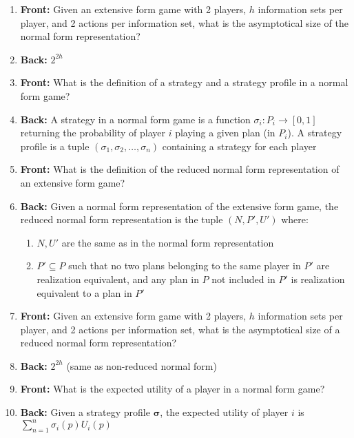 \documentclass{article}
\begin{document}
\begin{enumerate}
    \newpage\item \textbf{Front:} Given an extensive form game with 2 players, $h$ information sets per player, and 2 actions per information set, what is the asymptotical size of the normal form representation?
    \newpage\item \textbf{Back:} $2^{2h}$
    
    \newpage\item \textbf{Front:} What is the definition of a strategy and a strategy profile in a normal form game?
    \newpage\item \textbf{Back:} A strategy in a normal form game is a function $\sigma_i: P_i \rightarrow [0,1]$ returning the probability of player $i$ playing a given plan (in $P_i$).\newline
    A strategy profile is a tuple $(\sigma_1, \sigma_2, \ldots, \sigma_n)$ containing a strategy for each player
    
    \newpage\item \textbf{Front:} What is the definition of the reduced normal form representation of an extensive form game?
    \newpage\item \textbf{Back:} Given a normal form representation of the extensive form game, the reduced normal form representation is the tuple $(N, P', U')$ where:
    \begin{enumerate}
        \item $N, U'$ are the same as in the normal form representation
        \item $P' \subseteq P$ such that no two plans belonging to the same player in $P'$ are realization equivalent, and any plan in $P$ not included in $P'$ is realization equivalent to a plan in $P'$
    \end{enumerate}
    
    \newpage\item \textbf{Front:} Given an extensive form game with 2 players, $h$ information sets per player, and 2 actions per information set, what is the asymptotical size of a reduced normal form representation?
    \newpage\item \textbf{Back:} $2^{2h}$ (same as non-reduced normal form)
    
    \newpage\item \textbf{Front:} What is the expected utility of a player in a normal form game?
    \newpage\item \textbf{Back:} Given a strategy profile $\mathbf{\sigma}$, the expected utility of player $i$ is $\sum_{n=1}^{n} \sigma_i(p)U_i(p)$
    

\end{enumerate}
\end{document}
